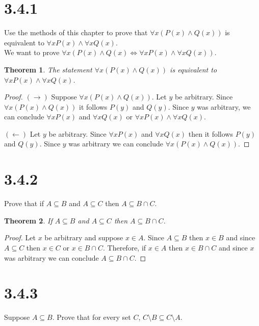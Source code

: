 \documentclass{article}
\newcommand{\n}{ \noindent }
\newtheorem*{theorem}{Theorem}  %
\begin{document}
\section*{3.4.1}
Use the methods of this chapter to prove that $\forall x (P(x) \land Q(x))$ is equivalent to $\forall x P(x) \land \forall x Q(x)$. \\

\n We want to prove
$\forall x(P(x) \land Q(x) \iff \forall x P(x) \land \forall x Q(x))$. \\

\begin{theorem} The statement $\forall x (P(x) \land Q(x))$ is equivalent to $\forall x P(x) \land \forall x Q(x)$.
\end{theorem}
\begin{proof}
$(\rightarrow)$ Suppose $\forall x (P(x) \land Q(x))$. Let $y$ be arbitrary. Since $\forall x (P(x) \land Q(x))$ it follows $P(y)$ and $Q(y)$. Since $y$ was arbitrary, we can conclude $\forall x P(x)$ and $\forall x Q(x)$ or $\forall x P(x) \land \forall x Q(x)$.

$(\leftarrow)$ Let $y$ be arbitrary. Since $\forall x P(x)$ and $\forall x Q(x)$ then it follows $P(y)$ and $Q(y)$. Since $y$ was arbitrary we can conclude $\forall x (P(x) \land Q(x))$. 
\end{proof}

\section*{3.4.2}
Prove that if $A \subseteq B$ and $A \subseteq C$ then $A \subseteq B \cap C$.

\begin{theorem} If $A \subseteq B$ and $A \subseteq C$ then $A \subseteq B \cap C$.
\end{theorem}
\begin{proof}
Let $x$ be arbitrary and suppose $x \in A$. Since $A \subseteq B$ then $x \in B$ and since $A \subseteq C$ then $x \in C$ or $x \in B \cap C$. Therefore, if $x \in A$ then $x \in B \cap C$ and since $x$ was arbitrary we can conclude $A \subseteq B \cap C$.
\end{proof}

\section*{3.4.3}
Suppose $A \subseteq B$. Prove that for every set $C$, $C \setminus B \subseteq C \setminus A$.
\end{document}
